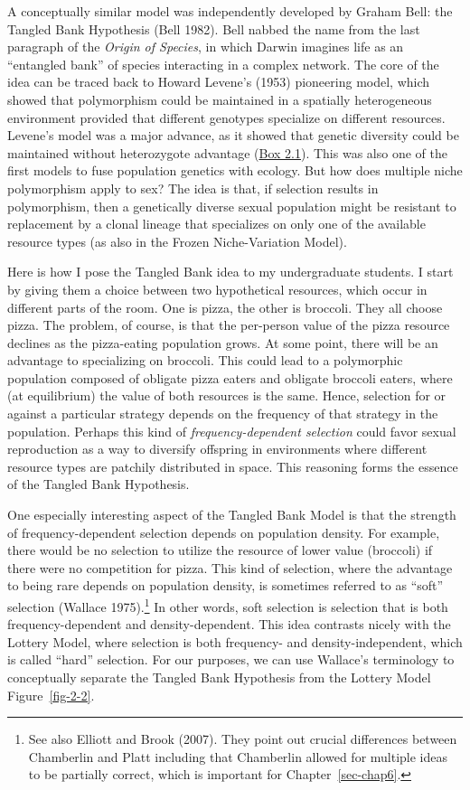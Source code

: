 \documentclass[
  letterpaper,
]{book}
\begin{document}
A conceptually similar model was independently developed by Graham Bell:
the Tangled Bank Hypothesis (Bell 1982). Bell nabbed the name from the
last paragraph of the \emph{Origin of Species}, in which Darwin imagines
life as an ``entangled bank'' of species interacting in a complex
network. The core of the idea can be traced back to Howard Levene's
(1953) pioneering model, which showed that polymorphism could be
maintained in a spatially heterogeneous environment provided that
different genotypes specialize on different resources. Levene's model
was a major advance, as it showed that genetic diversity could be
maintained without heterozygote advantage
(\protect\hyperlink{callout-2.1}{Box 2.1}). This was also one of the
first models to fuse population genetics with ecology. But how does
multiple niche polymorphism apply to sex? The idea is that, if selection
results in polymorphism, then a genetically diverse sexual population
might be resistant to replacement by a clonal lineage that specializes
on only one of the available resource types (as also in the Frozen
Niche-Variation Model).

Here is how I pose the Tangled Bank idea to my undergraduate students. I
start by giving them a choice between two hypothetical resources, which
occur in different parts of the room. One is pizza, the other is
broccoli. They all choose pizza. The problem, of course, is that the
per-person value of the pizza resource declines as the pizza-eating
population grows. At some point, there will be an advantage to
specializing on broccoli. This could lead to a polymorphic population
composed of obligate pizza eaters and obligate broccoli eaters, where
(at equilibrium) the value of both resources is the same. Hence,
selection for or against a particular strategy depends on the frequency
of that strategy in the population. Perhaps this kind of
\emph{frequency-dependent selection} could favor sexual reproduction as
a way to diversify offspring in environments where different resource
types are patchily distributed in space. This reasoning forms the
essence of the Tangled Bank Hypothesis.

One especially interesting aspect of the Tangled Bank Model is that the
strength of frequency-dependent selection depends on population density.
For example, there would be no selection to utilize the resource of
lower value (broccoli) if there were no competition for pizza. This kind
of selection, where the advantage to being rare depends on population
density, is sometimes referred to as ``soft'' selection (Wallace
1975).\footnote{See also Elliott and Brook (2007). They point out
  crucial differences between Chamberlin and Platt including that
  Chamberlin allowed for multiple ideas to be partially correct, which
  is important for Chapter~\ref{sec-chap6}.} In other words, soft
selection is selection that is both frequency-dependent and
density-dependent. This idea contrasts nicely with the Lottery Model,
where selection is both frequency- and density-independent, which is
called ``hard'' selection. For our purposes, we can use Wallace's
terminology to conceptually separate the Tangled Bank Hypothesis from
the Lottery Model Figure~\ref{fig-2-2}.
\end{document}
